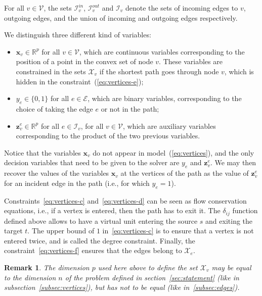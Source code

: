\documentclass[a4paper, 12pt]{article}
\newlength{\indentsize}
\newtheorem*{remark}{Remark}
\begin{document}
For all $v \in \mathcal{V}$, the sets $\mathcal{I}_v^{in}$, $\mathcal{I}_v^{out}$ and $\mathcal{I}_v$ denote the sets of incoming edges to $v$, outgoing edges, and the union of incoming and outgoing edges respectively.

\hspace{\indentsize} We distinguish three different kind of variables:
\begin{itemize}
    \item $\mathbf{x}_v \in \mathbb{R}^p$ for all $v \in \mathcal{V}$, which are continuous variables corresponding to the position of a point in the convex set of node $v$. These variables are constrained in the sets $\mathcal{X}_v$ if the shortest path goes through node $v$, which is hidden in the constraint~(\ref{eq:vertices-e});
    \item $y_e \in \{0,1\}$ for all $e \in \mathcal{E}$, which are binary variables, corresponding to the choice of taking the edge $e$ or not in the path;
    \item $\mathbf{z}_v^e \in \mathbb{R}^p$ for all $e \in \mathcal{I}_v$, for all $v \in \mathcal{V}$, which are auxiliary variables corresponding to the product of the two previous variables.
\end{itemize}
Notice that the variables $\mathbf{x}_v$ do not appear in model~(\ref{eq:vertices}), and the only decision variables that need to be given to the solver are $y_e$ and $\mathbf{z}_v^e$. We may then recover the values of the variables $\mathbf{x}_v$ at the vertices of the path as the value of $\mathbf{z}_v^e$ for an incident edge in the path (i.e., for which $y_e = 1$).

\hspace{\indentsize} Constraints~\ref{eq:vertices-c} and~\ref{eq:vertices-d} can be seen as flow conservation equations, i.e., if a vertex is entered, then the path has to exit it. The $\delta_{ij}$ function defined above allows to have a virtual unit entering the source $s$ and exiting the target $t$. The upper bound of $1$ in~\ref{eq:vertices-c} is to ensure that a vertex is not entered twice, and is called the degree constraint. Finally, the constraint~\ref{eq:vertices-f} ensures that the edges belong to $\mathcal{X}_e$.

\begin{remark} The dimension $p$ used here above to define the set $\mathcal{X}_v$ may be equal to the dimension $n$ of the problem defined in section~\ref{sec:statement} (like in subsection~\ref{subsec:vertices}), but has not to be equal (like in~\ref{subsec:edges}).\end{remark}
\end{document}
